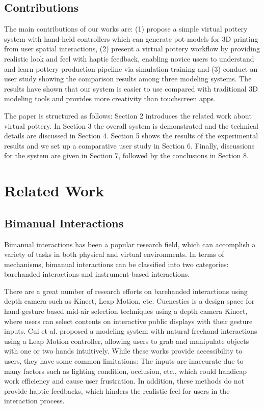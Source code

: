 \documentclass{svjour3}                     %
\begin{document}
\subsection{Contributions}
\label{sec:1.2}

The main contributions of our works are:
%
(1) propose a simple virtual pottery system with hand-held controllers which can generate pot models for 3D printing from user spatial interactions,
%
(2) present a virtual pottery workflow by providing realistic look and feel with haptic feedback, enabling novice users to understand and learn pottery production pipeline via simulation training 
%
and (3) conduct an user study showing the comparison results among three modeling systems. The results have shown that our system is easier to use compared with traditional 3D modeling tools and provides more creativity than touchscreen apps.

The paper is structured as follows:
Section 2 introduces the related work about virtual pottery.
In Section 3 the overall system is demonstrated and the technical details are discussed in Section 4.
Section 5 shows the results of the experimental results and we set up a comparative user study in Section 6.
Finally, discussions for the system are given in Section 7, followed by the conclusions in Section 8.

\section{Related Work}
\label{sec:2}

\subsection{Bimanual Interactions}
\label{sec:2.1}
Bimanual interactions has been a popular research field, which can accomplish a variety of tasks in both physical and virtual environments.
In terms of mechanisms, bimanual interactions can be classified into two categories: barehanded interactions and instrument-based interactions.

There are a great number of research efforts \cite{walter2014cuenesics,cui2016exploration,ramani2015gesture,murugappan2013handy,han2014virtual} on barehanded interactions using depth camera such as Kinect, Leap Motion, etc.
Cuenestics \cite{walter2014cuenesics} is a design space for hand-gesture based mid-air selection techniques using a depth camera Kinect, where users can select contents on interactive public displays with their gesture inputs.
Cui et al. \cite{cui2016exploration} proposed a modeling system with natural freehand interactions using a Leap Motion controller, allowing users to grab and manipulate objects with one or two hands intuitively.
While these works provide accessibility to users, they have some common limitations: The inputs are inaccurate due to many factors such as lighting condition, occlusion, etc., which could handicap work efficiency and cause user frustration.
In addition, these methods do not provide haptic feedbacks, which hinders the realistic feel for users in the interaction process.
\end{document}
